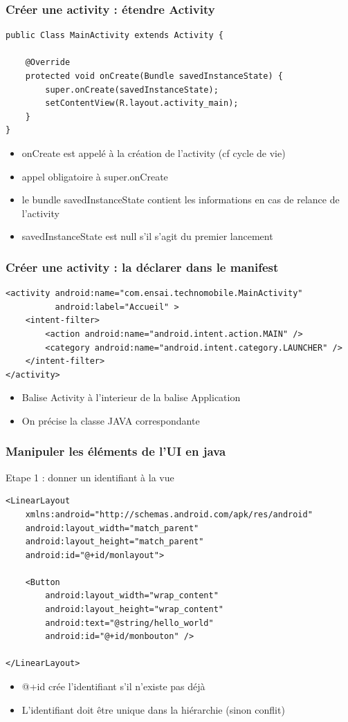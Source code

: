 \documentclass{beamer}
\begin{document}
\begin{frame}[fragile]
\frametitle{Créer une activity : étendre Activity} 
\begin{lstlisting}
public Class MainActivity extends Activity {

    @Override
    protected void onCreate(Bundle savedInstanceState) {
        super.onCreate(savedInstanceState);
        setContentView(R.layout.activity_main);
    }
}
\end{lstlisting}
 \begin{itemize}
 \item onCreate est appelé à la création de l'activity (cf cycle de vie)
 \item appel obligatoire à super.onCreate
 \item le bundle savedInstanceState contient les informations en cas de relance
 de l'activity
 \item savedInstanceState est null s'il s'agit du premier lancement
 \end{itemize}
\end{frame}
\begin{frame}[fragile]
\frametitle{Créer une activity : la déclarer dans le manifest} 
\begin{lstlisting}
<activity android:name="com.ensai.technomobile.MainActivity"
          android:label="Accueil" >
    <intent-filter>
        <action android:name="android.intent.action.MAIN" />
        <category android:name="android.intent.category.LAUNCHER" />
    </intent-filter>
</activity>
\end{lstlisting}
 \begin{itemize}
 \item Balise Activity à l'interieur de la balise Application
 \item On précise la classe JAVA correspondante
 \end{itemize}
\end{frame}
\begin{frame}[fragile]
\frametitle{Manipuler les éléments de l'UI en java}
Etape 1 : donner un identifiant à la vue
\begin{lstlisting}
<LinearLayout 
	xmlns:android="http://schemas.android.com/apk/res/android"
    android:layout_width="match_parent"
    android:layout_height="match_parent"
    android:id="@+id/monlayout">

    <Button
        android:layout_width="wrap_content"
        android:layout_height="wrap_content"
        android:text="@string/hello_world"
        android:id="@+id/monbouton" />

</LinearLayout>
\end{lstlisting}
\begin{itemize}
    \item @+id crée l'identifiant s'il n'existe pas déjà
    \item L'identifiant doit être unique dans la hiérarchie (sinon conflit)
 \end{itemize}
\end{frame}
\end{document}
